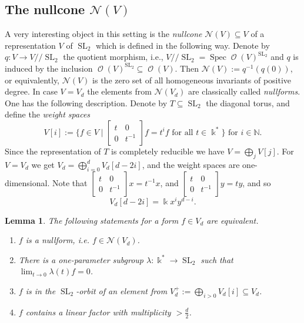 \documentclass{amsart}
\newtheorem{lem}[thm]{Lemma}
\theoremstyle{definition}
\theoremstyle{remark}
\begin{document}
{\par\smallskip}
\subsection{The nullcone ${\mathcal N}(V)$}
A very interesting object in this setting is the {\it nullcone} ${\mathcal N}(V) {\subseteq} V$ of a representation $V$ of ${\operatorname{SL}_{2}}$ which is defined in the following way. Denote by $q \colon V \to V{/\!\!/}{\operatorname{SL}_{2}}$ the quotient morphism, i.e., $V{/\!\!/}{\operatorname{SL}_{2}} = \operatorname{Spec}\operatorname{\mathcal O}(V)^{\operatorname{SL}_{2}}$ and $q$ is induced by the inclusion $\operatorname{\mathcal O}(V)^{\operatorname{SL}_{2}} {\subseteq} \operatorname{\mathcal O}(V)$. Then ${\mathcal N}(V):=q^{-1}(q(0))$, or equivalently,  ${\mathcal N}(V)$ is the zero set of all homogeneous invariants of positive degree. In case $V = V_{d}$ the elements from ${\mathcal N}(V_{d})$ are classically called {\it nullforms}. One has the following description. Denote by $T {\subseteq} {\operatorname{SL}_{2}}$ the diagonal torus, and define the {\it weight spaces}
$$
V[i]:=\{f \in V \mid \left[\begin{smallmatrix} t & 0 \\ 0 & t^{-1}\end{smallmatrix}\right] f = t^{i}f \text{  for all }t \in {\Bbbk}^{*}\} \text{ \ for } i \in {\mathbb N}.
$$
Since the representation of $T$ is completely reducible we have $V = \bigoplus_{j} V[j]$. For $V = V_{d}$ we get $V_{d} = \bigoplus_{i=0}^{d} V_{d}[d-2i]$, and the weight spaces are one-dimensional.
Note that $\left[\begin{smallmatrix} t & 0 \\ 0 & t^{-1}\end{smallmatrix}\right] x = t^{-1}x$, and $\left[\begin{smallmatrix} t & 0 \\ 0 & t^{-1}\end{smallmatrix}\right] y = t y$, and so
$$
V_{d}[d-2i]={\Bbbk} x^{i}y^{d-i}.
$$
\begin{lem}
The following statements for a form $f \in V_{d}$ are equivalent.
\begin{enumerate}
\item[(i)] $f$ is a nullform, i.e. $f \in {\mathcal N}(V_{d})$.
\item[(ii)] There is a one-parameter subgroup $\lambda\colon {\Bbbk}^{*} \to {\operatorname{SL}_{2}}$ such that $\lim_{t\to 0}\lambda(t) f = 0$.
\item[(iii)] $f$ is in the ${\operatorname{SL}_{2}}$-orbit of an element from $V_{d}^{+}:=\bigoplus_{i>0} V_{d}[i] {\subseteq} V_{d}$.
\item[(iv)] $f$ contains a linear factor with multiplicity $> \frac{d}{2}$.
\end{enumerate}
\end{lem}
\end{document}
